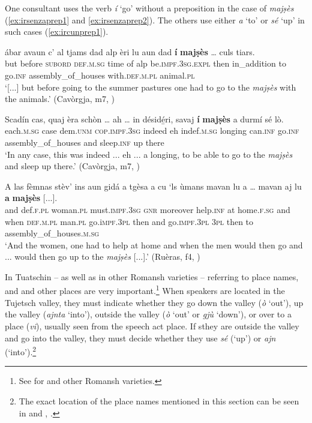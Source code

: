One consultant uses the verb \textit{í} `go' without a preposition in the case of \textit{majṣès} (\ref{ex:irsenzaprep1} and \ref{ex:irsenzaprep2}). The others use either \textit{a} `to' or \textit{sé} `up' in such cases (\ref{ex:ircunprep1}).

\ea
\label{ex:irsenzaprep1}
\gll  [...] ábar avaun c’ al tjams dad alp èri lu aun dad \textbf{í} \textbf{majṣès} … culs tiars.  \\
{} but before \textsc{subord} \textsc{def.m.sg} time of alp be.\textsc{impf.3sg.expl} then in\_addition to go.\textsc{inf} assembly\_of\_houses {} with.\textsc{def.m.pl} animal.\textsc{pl}\\
\glt `[...] but before going to the summer pastures one had to go to the \textit{majṣès} with the animals.' (Cavòrgja, m7, )
\z

\ea
\label{ex:irsenzaprep2}
\gll Scadín cas, quaj èra schòn … ah … in désidé̱ri, savaj \textbf{í} \textbf{majṣès} a durmí sé lò.\\
each.\textsc{m.sg} case dem.\textsc{unm} \textsc{cop.impf.3sg} indeed {} eh {} indef.\textsc{m.sg} longing can.\textsc{inf} go.\textsc{inf} assembly\_of\_houses and sleep.\textsc{inf} up there\\
\glt `In any case, this was indeed ... eh ... a longing, to be able to go to the \textit{majṣès} and sleep up there.' (Cavòrgja, m7, )
\z

\ea
\label{ex:ircunprep1}
\gll A las fèmnas stèv’ ins aun gidá a tgèsa a cu `ls ùmans mavan lu a … mavan aj lu \textbf{a} \textbf{majṣès} [...].\\
and def.\textsc{f.pl} woman.\textsc{pl} must.\textsc{impf.3sg} \textsc{gnr} moreover help.\textsc{inf} at home.\textsc{f.sg} and when \textsc{def.m.pl} man.\textsc{pl} go.i\textsc{mpf.3pl} then and {} go.\textsc{impf.3pl} \textsc{3pl} then to assembly\_of\_houses.\textsc{m.sg}\\
\glt `And the women, one had to help at home and when the men would then go and ... would then go up to the \textit{majṣès} [...].' (Ruèras, f4, )
\z

In Tuatschin -- as well as in other Romansh varieties --  referring to place names, and and other places are very important.\footnote{See \citep[4--126]{Ebneter1994} for  and other Romansh varieties.} When  speakers are located in the Tujetsch valley, they must indicate whether they go down the valley (\textit{ò} `out'), up the valley (\textit{ajnta} `into'), outside the valley (\textit{ò} `out' or \textit{gjù} `down'), or over to a place (\textit{vi}), usually seen from the speech act place. If sthey are outside the valley and go into the valley, they must decide whether they use \textit{sé} (`up') or \textit{ajn} (`into').\footnote{The exact location of the place names mentioned in this section can be seen in  and , .}

